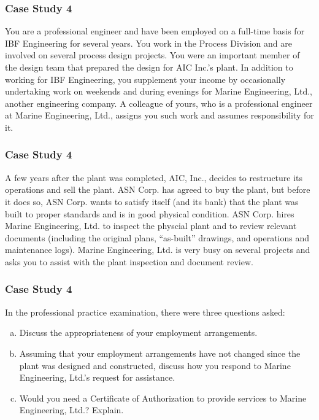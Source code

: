 \begin{frame}
\frametitle{Case Study 4}

You are a professional engineer and have been employed on a full-time basis for IBF Engineering for several years.  You work in the Process Division and are involved on several process design projects.  You were an important member of the design team that prepared the design for AIC Inc.'s plant.  In addition to working for IBF Engineering, you supplement your income by occasionally undertaking work on weekends and during evenings for Marine Engineering, Ltd., another engineering company.  A colleague of yours, who is a professional engineer at Marine Engineering, Ltd., assigns you such work and assumes responsibility for it.


\end{frame}

\begin{frame}
\frametitle{Case Study 4}

	A few years after the plant was completed, AIC, Inc., decides to restructure its operations and sell the plant.  ASN Corp. has agreed to buy the plant, but before it does so, ASN Corp. wants to satisfy itself (and its bank) that the plant was built to proper standards and is in good physical condition.  ASN Corp. hires Marine Engineering, Ltd. to inspect the physcial plant and to review relevant documents (including the original plans, ``as-built'' drawings, and operations and maintenance logs). Marine Engineering, Ltd. is very busy on several projects and asks you to assist with the plant inspection and document review.

\end{frame}




\begin{frame}
\frametitle{Case Study 4}


In the professional practice examination, there were three questions asked:

\begin{enumerate}[(a)] 
\item Discuss the appropriateness of your employment arrangements.
\item Assuming that your employment arrangements have not changed since the plant was designed and constructed, discuss how you respond to Marine Engineering, Ltd.'s request for assistance.
\item Would you need a Certificate of Authorization to provide services to Marine Engineering, Ltd.?  Explain.
\end{enumerate}

\end{frame}





